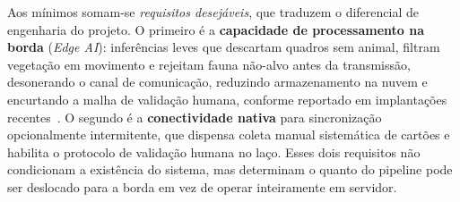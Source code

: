 Aos mínimos somam-se \emph{requisitos desejáveis}, que traduzem o diferencial de engenharia do projeto. O primeiro é a \textbf{capacidade de processamento na borda} (\emph{Edge AI}): inferências leves que descartam quadros sem animal, filtram vegetação em movimento e rejeitam fauna não-alvo antes da transmissão, desonerando o canal de comunicação, reduzindo armazenamento na nuvem e encurtando a malha de validação humana, conforme reportado em implantações recentes~\cite{velasco2024smartcameratraps,pishdast2025smartcameratraps,mulero2025addressing}. O segundo é a \textbf{conectividade nativa} para sincronização opcionalmente intermitente, que dispensa coleta manual sistemática de cartões e habilita o protocolo de validação humana no laço. Esses dois requisitos não condicionam a existência do sistema, mas determinam o quanto do pipeline pode ser deslocado para a borda em vez de operar inteiramente em servidor.
